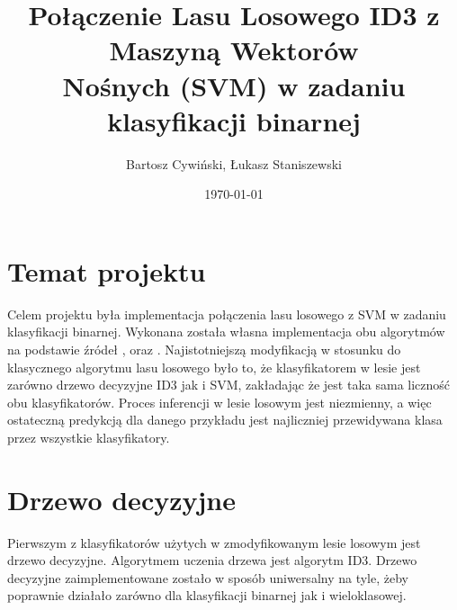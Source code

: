 \documentclass[
    left=2.5cm,         %
    right=2.5cm,        %
    top=2.5cm,          %
    bottom=3cm,         %
    bindingoffset=6mm,  %
    nohyphenation=false %
]{eiti/eiti-report}
\begin{document}
\title{
    Połączenie Lasu Losowego ID3 z Maszyną Wektorów\\
    Nośnych (SVM) w zadaniu klasyfikacji binarnej
}

\author{Bartosz Cywiński, Łukasz Staniszewski}

\date{\today}
\maketitle

\tableofcontents

\cleardoublepage %
\pagestyle{headings}

\newpage %
\section{Temat projektu}

Celem projektu była implementacja połączenia lasu losowego z SVM w zadaniu klasyfikacji binarnej. Wykonana została własna implementacja obu algorytmów na podstawie źródeł \cite{wsisvm},  \cite{umasvm} oraz \cite{eslII}. Najistotniejszą modyfikacją w stosunku do klasycznego algorytmu lasu losowego było to, że klasyfikatorem w lesie jest zarówno drzewo decyzyjne ID3 jak i SVM, zakładając że jest taka sama liczność obu klasyfikatorów. Proces inferencji w lesie losowym jest niezmienny, a więc ostateczną predykcją dla danego przykładu jest najliczniej przewidywana klasa przez wszystkie klasyfikatory. 

\section{Drzewo decyzyjne}
Pierwszym z klasyfikatorów użytych w zmodyfikowanym lesie losowym jest drzewo decyzyjne. Algorytmem uczenia drzewa jest algorytm ID3. Drzewo decyzyjne zaimplementowane zostało w sposób uniwersalny na tyle, żeby poprawnie działało zarówno dla klasyfikacji binarnej jak i wieloklasowej.
\end{document}
